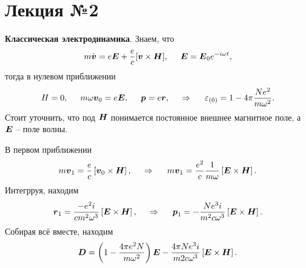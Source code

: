 \section*{Лекция №2}

\textbf{Классическая электродинамика}.
Знаем, что
\begin{equation*}
    m \dot{\mbox{\boldmath $v$}} = e \mbox{\boldmath $E$} + \frac{e}{c} [\mbox{\boldmath $v$} \times  \mbox{\boldmath $H$}],
    \hspace{5 mm} 
    \mbox{\boldmath $E$} = \mbox{\boldmath $E$}_0 e^{-i \omega t},
\end{equation*}
тогда в нулевом приближении
\begin{equation*}
    H = 0, \hspace{5 mm} m \omega \mbox{\boldmath $v$}_0 = e \mbox{\boldmath $E$},
    \hspace{5 mm} 
    \mbox{\boldmath $p$} = e \mbox{\boldmath $r$},
    \hspace{0.5cm} \Rightarrow \hspace{0.5cm}  
    \varepsilon_{(0)} = 1 - 4 \pi \frac{N e^2}{m \omega^2}.
\end{equation*}
Стоит уточнить, что под $\mbox{\boldmath $H$}$ понимается постоянное внешнее магнитное  поле, а $\mbox{\boldmath $E$}$ -- поле волны.

В первом приближении
\begin{equation*}
    m \mbox{\boldmath $v$}_1 = \frac{e}{c}\left[\mbox{\boldmath $v$}_0 \times \mbox{\boldmath $H$}\right],
    \hspace{0.5cm} \Rightarrow \hspace{0.5cm}
    m \mbox{\boldmath $v$}_1 = \frac{e^2}{c} \frac{1}{m \omega} \left[\mbox{\boldmath $E$} \times  \mbox{\boldmath $H$}\right].
\end{equation*}
Интегрруя, находим
\begin{equation*}
    \mbox{\boldmath $r$}_1 = \frac{-e^2 i}{c m^2 \omega^3} \left[\mbox{\boldmath $E$} \times  \mbox{\boldmath $H$}\right],
    \hspace{0.5cm} \Rightarrow \hspace{0.5cm}
    \mbox{\boldmath $p$}_1 = - \frac{N e^3 i}{m^2 c \omega^3} \left[\mbox{\boldmath $E$} \times  \mbox{\boldmath $H$}\right].
\end{equation*}
Собирая всё вместе, находим
\begin{equation*}
    \mbox{\boldmath $D$} = \left(1 - \frac{4 \pi e^2 N}{m \omega^2}\right) \mbox{\boldmath $E$} - \frac{4 \pi N e^3 i}{m2 c \omega^3} \left[\mbox{\boldmath $E$} \times  \mbox{\boldmath $H$}\right].
\end{equation*}

